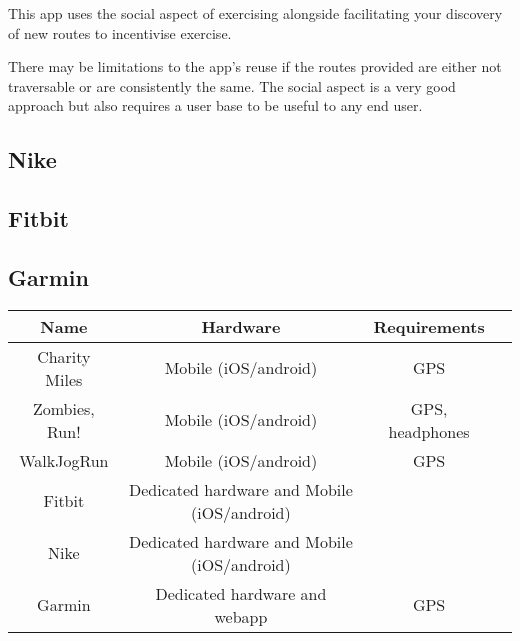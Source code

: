 This app uses the social aspect of exercising alongside facilitating your discovery of new routes to incentivise exercise.

There may be limitations to the app's reuse if the routes provided are either not traversable or are consistently the same. The social aspect is a very good approach but also requires a user base to be useful to any end user.

\subsection{Nike}

\subsection{Fitbit}

\subsection{Garmin}


\begin{tabular}{ | c | c | c | c  |} \hline
 Name & Hardware & Requirements \\ \hline
 Charity Miles & Mobile (iOS/android) & GPS \\ \hline
 Zombies, Run! & Mobile (iOS/android) & GPS, headphones \\ \hline
 WalkJogRun & Mobile (iOS/android) & GPS \\ \hline
 Fitbit & Dedicated hardware and Mobile (iOS/android) & \\ \hline
 Nike & Dedicated hardware and Mobile (iOS/android) & \\ \hline
 Garmin & Dedicated hardware and webapp & GPS \\ \hline 
\end{tabular}








